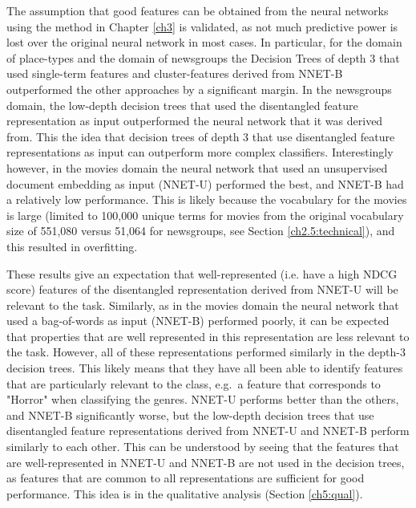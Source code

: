 The assumption that good  features can be obtained from the neural networks using the method in Chapter \ref{ch3} is validated, as not much predictive power is lost over the original neural network in most cases. In particular, for the domain of place-types and the domain of newsgroups the Decision Trees of depth 3 that used  single-term features and cluster-features derived from NNET-B outperformed the other approaches by a significant margin. In the newsgroups domain, the low-depth decision trees that used the disentangled feature representation as input outperformed the neural network that  it was derived from. This   the idea that decision trees of depth 3 that use disentangled feature representations as input can outperform more complex classifiers. Interestingly however, in the  movies domain the neural network that used an unsupervised document embedding as input (NNET-U) performed the best, and NNET-B had a relatively low performance.  This is likely because the vocabulary for the movies is large (limited to 100,000 unique terms for movies from the original vocabulary size of 551,080 versus 51,064 for newsgroups, see Section \ref{ch2.5:technical}), and this resulted in overfitting. 

These results give an  expectation that well-represented (i.e. have a high NDCG score) features of the disentangled representation derived from NNET-U  will be relevant to the task. Similarly, as in the movies domain the neural network that used a  bag-of-words as input (NNET-B) performed poorly, it can be expected that properties that are well represented in this representation are less relevant to the task. However, all of these representations performed similarly in the depth-3 decision trees. This likely means that they  have all been able to identify  features that are particularly relevant to the class, e.g.\ a feature that corresponds to "Horror" when classifying the genres. NNET-U performs better than the others, and NNET-B significantly worse, but the low-depth decision trees that use disentangled feature representations derived from NNET-U and NNET-B perform similarly to each other. This can be understood by seeing that the features that are well-represented in NNET-U and NNET-B are not used in the decision trees, as features that are common to all representations are sufficient for good performance. This idea is  in the qualitative analysis (Section \ref{ch5:qual}).


